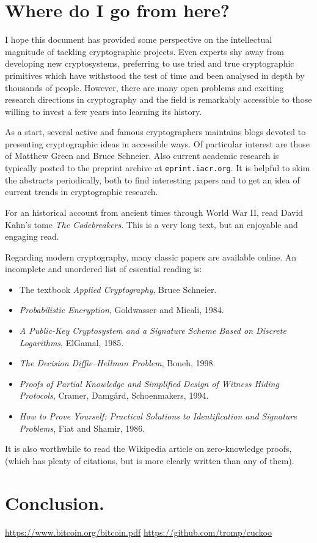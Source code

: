\documentclass[letterpaper]{article}
\begin{document}
\section{Where do I go from here?}

I hope this document has provided some perspective on the intellectual
magnitude of tackling cryptographic projects. Even experts shy away from
developing new cryptosystems, preferring to use tried and true cryptographic
primitives which have withstood the test of time and been analysed in depth
by thousands of people. However, there are many open problems and exciting
research directions in cryptography and the field is remarkably accessible
to those willing to invest a few years into learning its history.

As a start, several active and famous cryptographers maintains blogs devoted
to presenting cryptographic ideas in accessible ways. Of particular interest
are those of Matthew Green and Bruce Schneier. Also current academic research
is typically posted to the preprint archive at \texttt{eprint.iacr.org}. It
is helpful to skim the abstracts periodically, both to find interesting papers
and to get an idea of current trends in cryptographic research.

For an historical account from ancient times through World War II, read
David Kahn's tome \emph{The Codebreakers}. This is a very long text, but an
enjoyable and engaging read.

Regarding modern cryptography, many classic papers are available online. An
incomplete and unordered list of essential reading is:
\begin{itemize}
\item The textbook \emph{Applied Cryptography}, Bruce Schneier.
\item \emph{Probabilistic Encryption}, Goldwasser and Micali, 1984.
\item \emph{A Public-Key Cryptosystem and a Signature Scheme Based on Discrete Logarithms}, ElGamal, 1985.
\item \emph{The Decision Diffie–Hellman Problem}, Boneh, 1998.
\item \emph{Proofs of Partial Knowledge and Simplified Design of Witness Hiding Protocols}, Cramer, Damg{\aa}rd, Schoenmakers, 1994.
\item \emph{How to Prove Yourself: Practical Solutions to Identification and Signature Problems}, Fiat and Shamir, 1986.
\end{itemize}
It is also worthwhile to read the Wikipedia article on zero-knowledge proofs,
(which has plenty of citations, but is more clearly written than any of them).

\section{Conclusion.}

\begin{thebibliography}{9}
 \url{https://www.bitcoin.org/bitcoin.pdf}
 \url{https://github.com/tromp/cuckoo}
\end{thebibliography}
\end{document}
